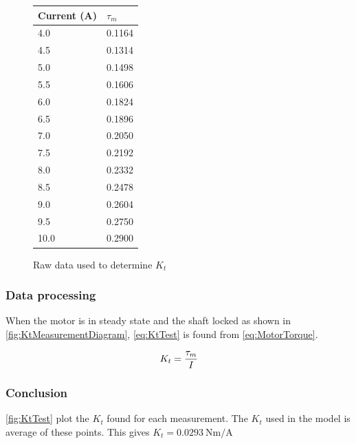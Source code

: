 \begin{figure}[htbp]
	\centering
	\caption{Raw data used to determine $K_t$}\label{tab_appendix:KtData}
	\begin{tabularx}{0.35\textwidth}{XX}
		Current (A) & $\tau_m$\\ \toprule \rowcolor{lightGrey}
	4.0 & 0.1164 \\
	4.5 & 0.1314 \\ \rowcolor{lightGrey}
	5.0 & 0.1498 \\
	5.5 & 0.1606 \\ \rowcolor{lightGrey}
	6.0 & 0.1824 \\
	6.5 & 0.1896 \\ \rowcolor{lightGrey}
	7.0 & 0.2050 \\
	7.5 & 0.2192 \\ \rowcolor{lightGrey}
	8.0 & 0.2332 \\
	8.5 & 0.2478 \\ \rowcolor{lightGrey}
	9.0 & 0.2604 \\
	9.5 & 0.2750 \\ \rowcolor{lightGrey}
	10.0 & 0.2900
	\end{tabularx}
\end{figure}

\subsubsection*{Data processing}

When the motor is in steady state and the shaft locked as shown in \autoref{fig:KtMeasurementDiagram}, \autoref{eq:KtTest} is found from \autoref{eq:MotorTorque}.

\begin{equation}\label{eq:KtTest}
	K_t=\frac{\tau_m}{I} \addunit{\newton\meter\per\ampere}
\end{equation}

\startexplain
{}
\stopexplain

\subsubsection*{Conclusion}

\autoref{fig:KtTest} plot the $K_t$ found for each measurement. The $K_t$ used in the model is average of these points. This gives $K_t=\SI{0.0293}{\newton\meter\per\ampere}$

